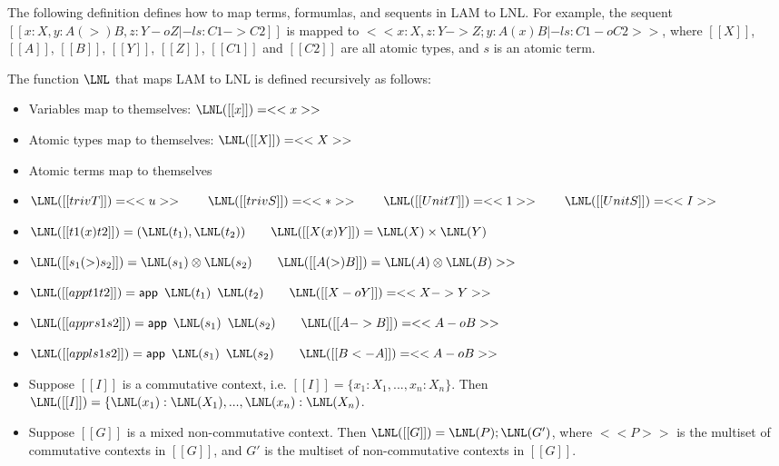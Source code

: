 The following definition defines how to map terms, formumlas, and sequents in LAM to LNL. For
example, the sequent $[[x : X, y : A (>) B, z : Y -o Z |-l s : C1 -> C2]]$ is mapped to
$<<x : X, z : Y -> Z; y : A (x) B |-l s : C1 -o C2>>$, where $[[X]]$, $[[A]]$, $[[B]]$, $[[Y]]$,
$[[Z]]$, $[[C1]]$ and $[[C2]]$ are all atomic types, and $s$ is an atomic term.

\begin{definition}
  The function $\LNL$ that maps LAM to LNL is defined recursively as follows:
  \begin{itemize}
  \item Variables map to themselves: $\LNL([[x]]) = <<x>>$
  \item Atomic types map to themselves: $\LNL([[X]]) = <<X>>$
  \item Atomic terms map to themselves
  \item $\LNL([[trivT]]) = <<u>> \qquad \LNL([[trivS]]) = <<*>> \qquad \LNL([[UnitT]]) = <<1>> \qquad \LNL([[UnitS]]) = <<I>>$
  \item $\LNL([[t1 (x) t2]]) = (\LNL(t_1),\LNL(t_2)) \qquad \LNL([[X (x) Y]])=\LNL(X)\times\LNL(Y) $
  \item $\LNL([[s_1 (>) s_2]]) = \LNL(s_1)\otimes\LNL(s_2) \qquad \LNL([[A (>) B]])=\LNL(A)\otimes\LNL(B)>>$
  \item $\LNL([[app t1 t2]]) = \mathsf{app}\,\,\,\LNL(t_1)\,\,\,\LNL(t_2) \qquad \LNL([[X -o Y]]) = <<X -> Y>>$
  \item $\LNL([[appr s1 s2]]) = \mathsf{app}\,\,\,\LNL(s_1)\,\,\,\LNL(s_2) \qquad \LNL([[A -> B]]) = <<A -o B>>$
  \item $\LNL([[appl s1 s2]]) = \mathsf{app}\,\,\,\LNL(s_1)\,\,\,\LNL(s_2) \qquad \LNL([[B <- A]]) = <<A -o B>>$
  \item Suppose $[[I]]$ is a commutative context, i.e. $[[I]]=\{x_1:X_1,...,x_n:X_n\}$. Then
        $\LNL([[I]])=\{\LNL(x_1):\LNL(X_1),...,\LNL(x_n):\LNL(X_n)$.
  \item Suppose $[[G]]$ is a mixed non-commutative context. Then
        $\LNL([[G]])=\LNL(P);\LNL(G')$, where $<<P>>$ is the multiset of commutative contexts
        in $[[G]]$, and $G'$ is the multiset of non-commutative contexts in $[[G]]$.
  \end{itemize}
\end{definition}


